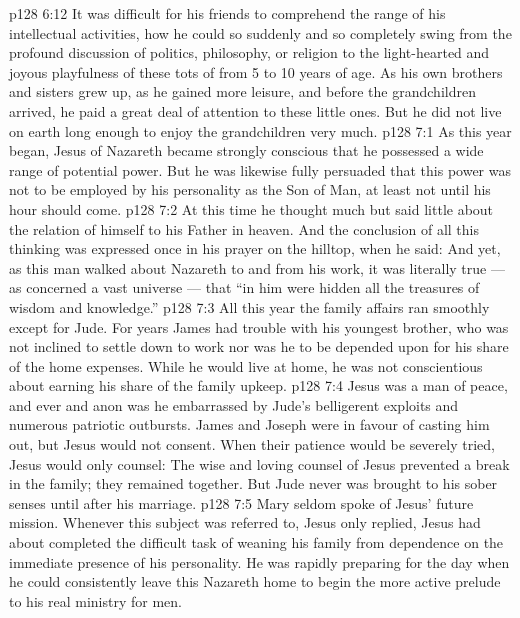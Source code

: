 \vs p128 6:12 It was difficult for his friends to comprehend the range of his intellectual activities, how he could so suddenly and so completely swing from the profound discussion of politics, philosophy, or religion to the light\hyp{}hearted and joyous playfulness of these tots of from 5 to 10 years of age. As his own brothers and sisters grew up, as he gained more leisure, and before the grandchildren arrived, he paid a great deal of attention to these little ones. But he did not live on earth long enough to enjoy the grandchildren very much.
\vs p128 7:1 As this year began, Jesus of Nazareth became strongly conscious that he possessed a wide range of potential power. But he was likewise fully persuaded that this power was not to be employed by his personality as the Son of Man, at least not until his hour should come.
\vs p128 7:2 At this time he thought much but said little about the relation of himself to his Father in heaven. And the conclusion of all this thinking was expressed once in his prayer on the hilltop, when he said:  And yet, as this man walked about Nazareth to and from his work, it was literally true --- as concerned a vast universe --- that “in him were hidden all the treasures of wisdom and knowledge.”
\vs p128 7:3 \pc All this year the family affairs ran smoothly except for Jude. For years James had trouble with his youngest brother, who was not inclined to settle down to work nor was he to be depended upon for his share of the home expenses. While he would live at home, he was not conscientious about earning his share of the family upkeep.
\vs p128 7:4 Jesus was a man of peace, and ever and anon was he embarrassed by Jude’s belligerent exploits and numerous patriotic outbursts. James and Joseph were in favour of casting him out, but Jesus would not consent. When their patience would be severely tried, Jesus would only counsel:  The wise and loving counsel of Jesus prevented a break in the family; they remained together. But Jude never was brought to his sober senses until after his marriage.
\vs p128 7:5 Mary seldom spoke of Jesus’ future mission. Whenever this subject was referred to, Jesus only replied,  Jesus had about completed the difficult task of weaning his family from dependence on the immediate presence of his personality. He was rapidly preparing for the day when he could consistently leave this Nazareth home to begin the more active prelude to his real ministry for men.
